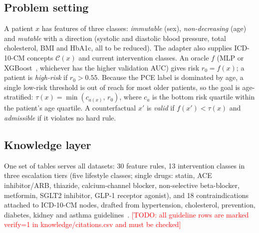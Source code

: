 \documentclass[conference]{IEEEtran}
\newcommand{\todo}[1]{\textcolor{red}{[TODO: #1]}}
\begin{document}
\subsection{Problem setting}
A patient $x$ has features of three classes: \emph{immutable} (sex), \emph{non-decreasing} (age) and \emph{mutable} with a direction (systolic and diastolic blood pressure, total cholesterol, BMI and HbA1c, all to be reduced). The adapter also supplies ICD-10-CM concepts $\mathcal{C}(x)$ and current intervention classes. An oracle $f$ (MLP or XGBoost~\cite{chen2016xgboost}, whichever has the higher validation AUC) gives risk $r_0=f(x)$; a patient is \emph{high-risk} if $r_0>0.55$. Because the PCE label is dominated by age, a single low-risk threshold is out of reach for most older patients, so the goal is age-stratified: $\tau(x)=\min(c_{a(x)},\,r_0)$, where $c_{a}$ is the bottom risk quartile within the patient's age quartile. A counterfactual $x'$ is \emph{valid} if $f(x')<\tau(x)$ and \emph{admissible} if it violates no hard rule.

\subsection{Knowledge layer}
One set of tables serves all datasets: 30 feature rules, 13 intervention classes in three escalation tiers (five lifestyle classes; single drugs: statin, ACE inhibitor/ARB, thiazide, calcium-channel blocker, non-selective beta-blocker, metformin, SGLT2 inhibitor, GLP-1 receptor agonist), and 18 contraindications attached to ICD-10-CM nodes, drafted from hypertension, cholesterol, prevention, diabetes, kidney and asthma guidelines~\cite{whelton2018htn,grundy2019chol,arnett2019prev,ada2024standards,kdigo2024ckd,gina2024}. \todo{all guideline rows are marked verify=1 in knowledge/citations.csv and must be checked}
\end{document}
